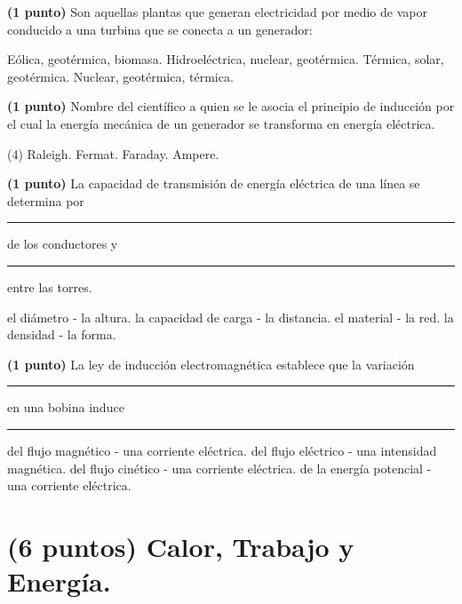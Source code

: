 \documentclass[12pt, letter]{exam}
\begin{document}
\begin{questions}
    \question \textbf{(1 punto)} Son aquellas plantas que generan electricidad por medio de vapor conducido a una turbina que se conecta a un generador:
    \begin{multicols}{2}
    \begin{tasks}
        \task Eólica, geotérmica, biomasa.
        \task Hidroeléctrica, nuclear, geotérmica.
        \task Térmica, solar, geotérmica.
        \task Nuclear, geotérmica, térmica.
    \end{tasks}
    \end{multicols}
    \question \textbf{(1 punto)} Nombre del científico a quien se le asocia el principio de inducción por el cual la energía mecánica de un generador se transforma en energía eléctrica.
    \begin{tasks}(4)
        \task Raleigh.
        \task Fermat.
        \task Faraday.
        \task Ampere.
    \end{tasks}

    \newpage

    \question \textbf{(1 punto)} La capacidad de transmisión de energía eléctrica de una línea se determina por \rule{2cm}{0.1mm} de los conductores y \rule{2cm}{0.1mm} entre las torres.
    \begin{multicols}{2}
    \begin{tasks}
        \task el diámetro - la altura.
        \task la capacidad de carga - la distancia.
        \task el material - la red.
        \task la densidad - la forma.
    \end{tasks}
    \end{multicols}
    \question \textbf{(1 punto)} La ley de inducción electromagnética establece que la variación \rule{2cm}{0.1mm}  en una bobina induce \rule{2cm}{0.1mm}
    \begin{tasks}
        \task del flujo magnético - una corriente eléctrica.
        \task del flujo eléctrico - una intensidad magnética.
        \task del flujo cinético - una corriente eléctrica.
        \task de la energía potencial - una corriente eléctrica.
    \end{tasks}
    
    \section{(6 puntos) Calor, Trabajo y Energía.}
    

\end{questions}
\end{document}
